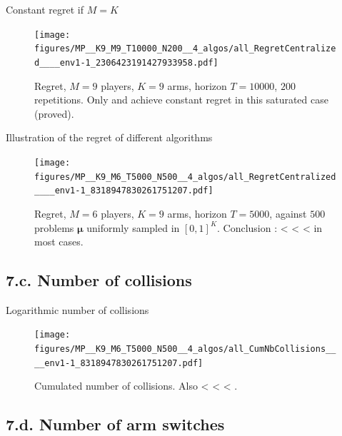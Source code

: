 \documentclass[12pt,english,ignorenonframetext,]{beamer}
\begin{document}
\begin{frame}[plain]{Constant regret if \(M=K\)}

\begin{figure}[h!]
\centering
\texttt{[image: figures/MP\_\_K9\_M9\_T10000\_N200\_\_4\_algos/all\_RegretCentralized\_\_\_\_env1-1\_2306423191427933958.pdf]}
\caption{\footnotesize{Regret, $M=9$ players, $K=9$ arms, horizon $T=10000$, $200$ repetitions. Only \textcolor{red}{\RandTopM{}} and \textcolor{yellowgreen}{\MCTopM{}} achieve constant regret in this saturated case (proved).}}
\end{figure}

\end{frame}


\begin{frame}[plain]{Illustration of the regret of different algorithms}

\begin{figure}[h!]
\centering
\texttt{[image: figures/MP\_\_K9\_M6\_T5000\_N500\_\_4\_algos/all\_RegretCentralized\_\_\_\_env1-1\_8318947830261751207.pdf]}
\caption{\footnotesize{Regret, $M=6$ players, $K=9$ arms, horizon $T=5000$, against $500$ problems $\boldsymbol{\mu}$ uniformly sampled in $[0,1]^K$. Conclusion : \textcolor{blue}{\rhoRand{}} < \textcolor{red}{\RandTopM{}} < \textcolor{bluegreen}{\Selfish{}} < \textcolor{yellowgreen}{\MCTopM{}} in most cases.}}
\end{figure}

\end{frame}


\subsection{\hfill{}7.c. Number of collisions\hfill{}}

\begin{frame}[plain]{Logarithmic number of collisions}

\begin{figure}[h!]
\centering
\texttt{[image: figures/MP\_\_K9\_M6\_T5000\_N500\_\_4\_algos/all\_CumNbCollisions\_\_\_\_env1-1\_8318947830261751207.pdf]}
\caption{\footnotesize{Cumulated number of collisions. Also \textcolor{blue}{\rhoRand{}} < \textcolor{red}{\RandTopM{}} < \textcolor{bluegreen}{\Selfish{}} < \textcolor{yellowgreen}{\MCTopM{}}.}}
\end{figure}

\end{frame}


\subsection{\hfill{}7.d. Number of arm switches\hfill{}}
\end{document}
